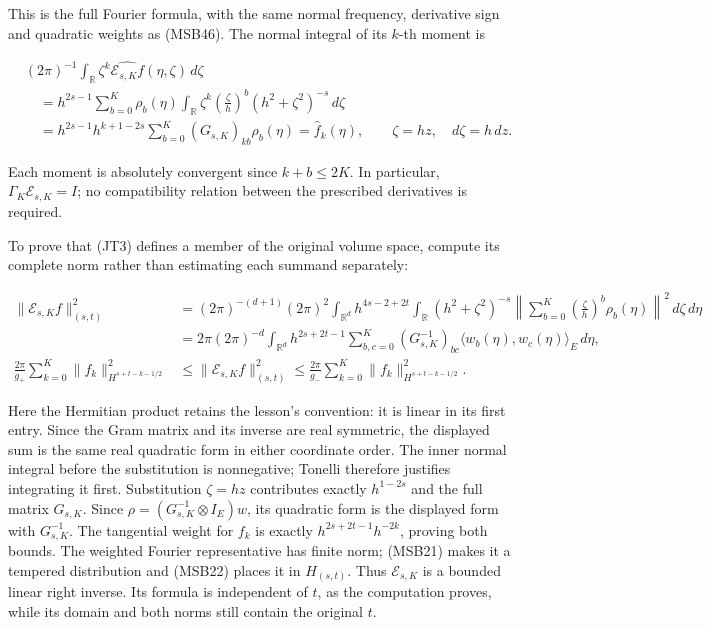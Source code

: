 \documentclass[
  11pt,
]{article}
\begin{document}
This is the full Fourier formula, with the same normal frequency,
derivative sign and quadratic weights as (MSB46). The normal integral of
its \(k\)-th moment is

\[
 \begin{aligned}
 &(2\pi)^{-1}\int_{\mathbb R}\zeta^k
              \widehat{\mathcal E_{s,K}f}(\eta,\zeta)\,d\zeta\\
 &\quad=h^{2s-1}\sum_{b=0}^K\rho_b(\eta)
        \int_{\mathbb R}\zeta^k
            \left(\frac\zeta h\right)^b
               (h^2+\zeta^2)^{-s}\,d\zeta\\
 &\quad=h^{2s-1}h^{k+1-2s}
           \sum_{b=0}^K(G_{s,K})_{kb}\rho_b(\eta)
        =\widehat f_k(\eta),
       \qquad \zeta=hz,\quad d\zeta=h\,dz.
 \end{aligned}
 \tag{JT4}
\]

Each moment is absolutely convergent since \(k+b\leq2K\). In particular,
\(\Gamma_K\mathcal E_{s,K}=I\); no compatibility relation between the
prescribed derivatives is required.

To prove that (JT3) defines a member of the original volume space,
compute its complete norm rather than estimating each summand
separately:

\[
 \begin{aligned}
 \|\mathcal E_{s,K}f\|_{(s,t)}^2
 &=(2\pi)^{-(d+1)}(2\pi)^2
   \int_{\mathbb R^d}h^{4s-2+2t}
   \int_{\mathbb R}(h^2+\zeta^2)^{-s}
         \left\|\sum_{b=0}^K\left(\frac\zeta h\right)^b
                      \rho_b(\eta)\right\|^2\,d\zeta\,d\eta\\
 &=2\pi(2\pi)^{-d}\int_{\mathbb R^d}
         h^{2s+2t-1}\sum_{b,c=0}^K
                 (G_{s,K}^{-1})_{bc}
                    \langle w_b(\eta),w_c(\eta)\rangle_E\,d\eta,\\
 \frac{2\pi}{g_+}\sum_{k=0}^K
          \|f_k\|_{H^{s+t-k-1/2}}^2
 &\leq\|\mathcal E_{s,K}f\|_{(s,t)}^2
 \leq\frac{2\pi}{g_-}\sum_{k=0}^K
          \|f_k\|_{H^{s+t-k-1/2}}^2.
 \end{aligned}
 \tag{JT5}
\]

Here the Hermitian product retains the lesson's convention: it is linear
in its first entry. Since the Gram matrix and its inverse are real
symmetric, the displayed sum is the same real quadratic form in either
coordinate order. The inner normal integral before the substitution is
nonnegative; Tonelli therefore justifies integrating it first.
Substitution \(\zeta=hz\) contributes exactly \(h^{1-2s}\) and the full
matrix \(G_{s,K}\). Since \(\rho=(G_{s,K}^{-1}\otimes I_E)w\), its
quadratic form is the displayed form with \(G_{s,K}^{-1}\). The
tangential weight for \(f_k\) is exactly \(h^{2s+2t-1}h^{-2k}\), proving
both bounds. The weighted Fourier representative has finite norm;
(MSB21) makes it a tempered distribution and (MSB22) places it in
\(H_{(s,t)}\). Thus \(\mathcal E_{s,K}\) is a bounded linear right
inverse. Its formula is independent of \(t\), as the computation proves,
while its domain and both norms still contain the original \(t\).
\end{document}
